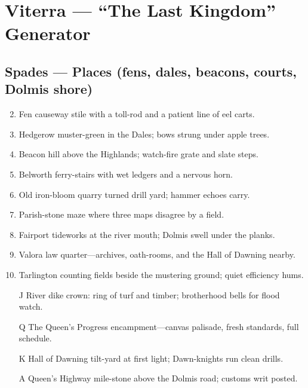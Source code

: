 \chapter{Viterra --- ``The Last Kingdom'' Generator}
\label{chap:viterra}

\section*{Spades --- Places (fens, dales, beacons, courts, Dolmis shore)}
\label{sec:viterra-places}
\begin{enumerate}
\setcounter{enumi}{1}
\item Fen causeway stile with a toll-rod and a patient line of eel carts.
\item Hedgerow muster-green in the Dales; bows strung under apple trees.
\item Beacon hill above the Highlands; watch-fire grate and slate steps.
\item Belworth ferry-stairs with wet ledgers and a nervous horn.
\item Old iron-bloom quarry turned drill yard; hammer echoes carry.
\item Parish-stone maze where three maps disagree by a field.
\item Fairport tideworks at the river mouth; Dolmis swell under the planks.
\item Valora law quarter---archives, oath-rooms, and the Hall of Dawning nearby.
\item Tarlington counting fields beside the mustering ground; quiet efficiency hums.
\item[J] River dike crown: ring of turf and timber; brotherhood bells for flood watch.
\item[Q] The Queen's Progress encampment---canvas palisade, fresh standards, full schedule.
\item[K] Hall of Dawning tilt-yard at first light; Dawn-knights run clean drills.
\item[A] Queen's Highway mile-stone above the Dolmis road; customs writ posted.
\end{enumerate}

